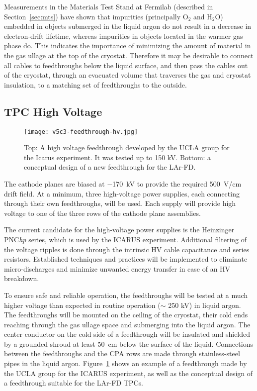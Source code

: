 Measurements in the Materials Test Stand at Fermilab (described in Section~\ref{sec:mts})
have shown that impurities (principally O$_2$ and H$_2$O) embedded in objects submerged in the liquid argon do not result in a decrease in electron-drift lifetime, whereas impurities in objects located in the warmer gas phase do. This indicates the importance of minimizing the amount of material in the gas ullage at the top of the cryostat.  Therefore it may be desirable to connect all cables to feedthroughs below the liquid surface, and then pass the cables out of the cryostat, through an evacuated volume that traverses the gas and cryostat insulation, to a matching set of feedthroughs to the outside. 

\subsection{TPC High Voltage }
\label{subsec:v5-tpc-feedthru-tpchv}

\begin{figure}[htbp]
\centering
\texttt{[image: v5c3-feedthrough-hv.jpg]}
\caption[ICARUS HV feedthrough; concept of new feedthrough]{Top: A high voltage feedthrough developed by the UCLA 
group for the Icarus experiment.  It was tested up to 150 kV.  Bottom: a conceptual design of a new feedthrough for the LAr-FD.}
\label{fig:tpc-UCLA-feedthrough}
\end{figure}

The cathode planes are biased at $-$170~kV to provide the required 
500~V/cm drift field. At a minimum, three high-voltage power 
supplies, each connecting through their own feedthroughs, will be used. Each supply will
provide high voltage to one of the three rows of the cathode plane assemblies.

The current candidate for the high-voltage power supplies is 
the Heinzinger PNC\textit{hp} series, which is used by the ICARUS 
experiment.  Additional filtering of the voltage ripples is done through the intrinsic HV cable capacitance 
and series resistors. Established techniques and practices will be implemented to eliminate 
micro-discharges and minimize unwanted energy transfer in case of an HV breakdown. 
  
To ensure safe and reliable operation, the feedthroughs will be 
tested at a much higher voltage than expected in
routine operation ($\sim$ 250 kV) in liquid argon. 
 The feedthroughs will be 
mounted on the ceiling of the cryostat, their cold ends reaching 
through the gas ullage space and submerging into the liquid argon. 
The center conductor on the cold side of a feedthrough will be 
insulated and shielded by a grounded shroud at least 50~cm below the 
surface of the liquid. Connections between the feedthroughs 
and the CPA rows are made through stainless-steel pipes in the 
liquid argon. Figure~\ref{fig:tpc-UCLA-feedthrough} shows an example 
of a feedthrough made by the UCLA group for the ICARUS experiment, as well as the conceptual design of a feedthrough suitable for the LAr-FD TPCs.

